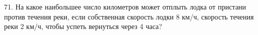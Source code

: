 71. На какое наибольшее число километров может отплыть лодка от пристани против течения реки, если собственная скорость лодки 8 км/ч, скорость течения реки 2 км/ч, чтобы успеть вернуться через 4 часа?\\
